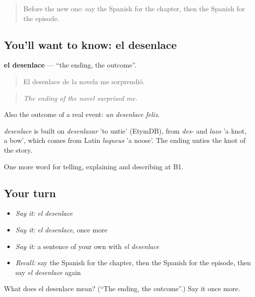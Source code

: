 \label{lesson:ES-C565-desenlace}



\begin{quote}
Before the new one: say the Spanish for the chapter, then the Spanish for the episode.
\end{quote}

\subsection*{You'll want to know: el desenlace}
\textbf{el desenlace} — \textquotedblleft{}the ending, the outcome\textquotedblright{}.

\begin{quote}
El desenlace de la novela me sorprendió.
\end{quote}

\begin{quote}
\emph{The ending of the novel surprised me.}
\end{quote}

Also the outcome of a real event: \emph{un desenlace feliz}.

\begin{cousinweb}
\emph{desenlace} is built on \emph{desenlazar} 'to untie' (EtymDB), from \emph{des-} and \emph{lazo} 'a knot, a bow', which comes from Latin \emph{laqueus} 'a noose'. The ending unties the knot of the story.
\end{cousinweb}

\begin{grammarlens}[title={What you've built}]
One more word for telling, explaining and describing at B1.
\end{grammarlens}

\subsection*{Your turn}
\begin{itemize}
\raggedright
  \item \emph{Say it:} \emph{el desenlace}
  \item \emph{Say it:} \emph{el desenlace}, once more
  \item \emph{Say it:} a sentence of your own with \emph{el desenlace}
  \item \emph{Recall:} say the Spanish for the chapter, then the Spanish for the episode, then say \emph{el desenlace} again
\end{itemize}

\begin{tcolorbox}[breakable,colback=teal!4,colframe=teal!35!black,title={Before you move on}]
What does el desenlace mean? (\textquotedblleft{}The ending, the outcome\textquotedblright{}.) Say it once more.
\end{tcolorbox}
